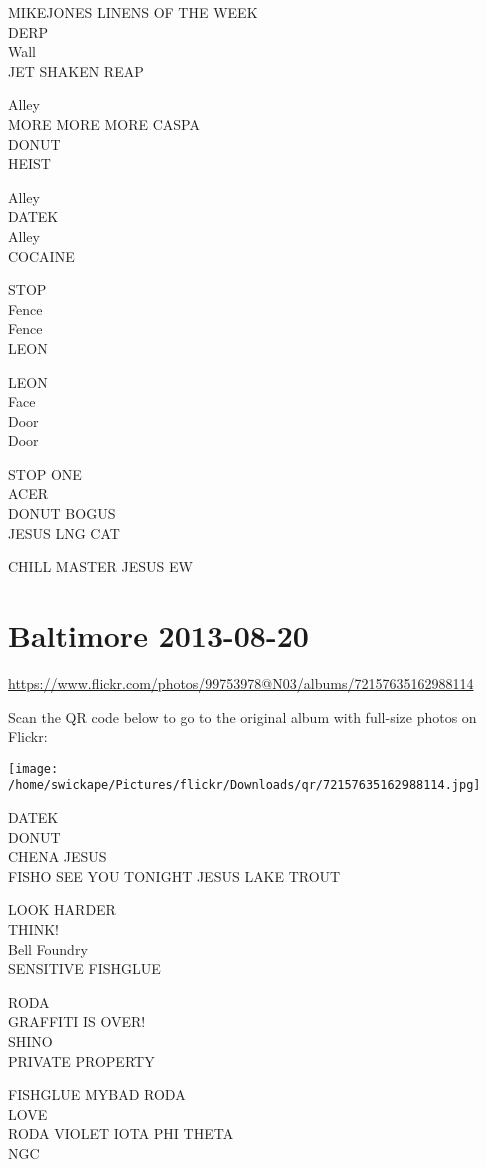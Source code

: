 \documentclass[10pt,letterpaper]{article}
\begin{document}
MIKEJONES LINENS OF THE WEEK\\
DERP\\
Wall\\
JET SHAKEN REAP

Alley\\
MORE MORE MORE CASPA\\
DONUT\\
HEIST

Alley\\
DATEK\\
Alley\\
COCAINE

STOP\\
Fence\\
Fence\\
LEON

LEON\\
Face\\
Door\\
Door

STOP ONE\\
ACER\\
DONUT BOGUS\\
JESUS LNG CAT

CHILL MASTER JESUS EW


\section*{Baltimore 2013-08-20}

\url{https://www.flickr.com/photos/99753978@N03/albums/72157635162988114}

Scan the QR code below to go to the original album with full-size photos on Flickr:

\texttt{[image: /home/swickape/Pictures/flickr/Downloads/qr/72157635162988114.jpg]}


DATEK\\
DONUT\\
CHENA JESUS\\
FISHO SEE YOU TONIGHT JESUS LAKE TROUT

LOOK HARDER\\
THINK!\\
Bell Foundry\\
SENSITIVE FISHGLUE

RODA\\
GRAFFITI IS OVER!\\
SHINO\\
PRIVATE PROPERTY

FISHGLUE MYBAD RODA\\
LOVE\\
RODA VIOLET IOTA PHI THETA\\
NGC
\end{document}
